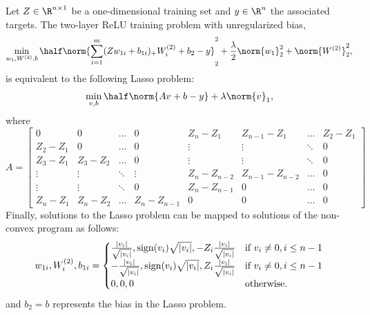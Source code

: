 

\begin{proposition}\label{prop:1d-to-lasso}
	Let \( Z \in \R^{n \times 1} \) be a one-dimensional training set
	and \( y \in \R^n \) the associated targets.
	The two-layer ReLU training problem with unregularized bias,
	\begin{equation}\label{eq:1d-relu}
		\begin{aligned}
			\min_{w_1, W^{(2)}, b} \half \norm{\sum_{i=1}^m (Z w_{1i} + b_{1i})_+ W^{(2)}_{i} + b_2 - y}_2^2
			+ \frac{\lambda}{2} \norm{w_1}^2_2 + \norm{W^{(2)}}_2^2,
		\end{aligned}
	\end{equation}
	is equivalent to the following Lasso problem:
	\begin{equation}\label{eq:1d-bi-dual}
		\min_{v, b} \half \norm{A v + b - y} + \lambda \norm{v}_1,
	\end{equation}
	where
	\[
		A =
		\begin{bmatrix}
			0         & 0         & \ldots & 0             & Z_n - Z_1       & Z_{n-1} - Z_1     & \ldots & Z_2 - Z_1 \\
			Z_2 - Z_1 & 0         & \ldots & 0             & \vdots          & \vdots            & \ddots & 0         \\
			Z_3 - Z_1 & Z_3 - Z_2 & \ldots & 0             & \vdots          & \vdots            & \ddots & 0         \\
			\vdots    & \vdots    & \ddots & \vdots        & Z_{n} - Z_{n-2} & Z_{n-1} - Z_{n-2} & \ldots & 0         \\
			\vdots    & \vdots    & \ddots & 0             & Z_{n} - Z_{n-1} & 0                 & \ldots & 0         \\
			Z_n - Z_1 & Z_n - Z_2 & \ldots & Z_n - Z_{n-1} & 0               & 0                 & \ldots & 0
		\end{bmatrix}
	\]
	Finally, solutions to the Lasso problem can be mapped to solutions of the
	non-convex program as follows:
	\begin{equation}
		w_{1i}, W^{(2)}_{i}, b_{1i} =
		\begin{cases}
			\frac{|v_i|}{\sqrt{|v_i|}}, \text{sign}(v_i) \sqrt{|v_i|}, - Z_i \frac{|v_i|}{\sqrt{|v_i|}} & \mbox{if \( v_i \neq 0, i \leq n-1 \)} \\
			-\frac{|v_i|}{\sqrt{|v_i|}}, \text{sign}(v_i) \sqrt{|v_i|}, Z_i \frac{|v_i|}{\sqrt{|v_i|}}  & \mbox{if \( v_i \neq 0, i \leq n-1 \)} \\
			0, 0, 0                                                                                     & \mbox{otherwise.}
		\end{cases}
	\end{equation}
	and \( b_2 = b \) represents the bias in the Lasso problem.

\end{proposition}
